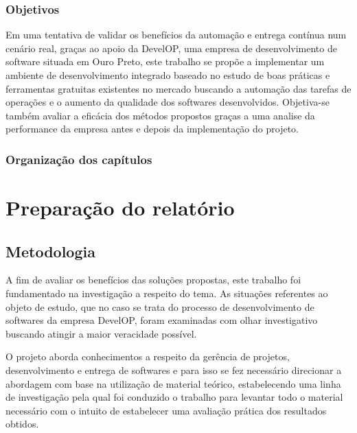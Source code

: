 \documentclass[
	12pt,				%
	openright,			%
	twoside,			%
	a4paper,			%
	english,			%
	french,				%
	spanish,			%
	brazil,				%
	]{abntex2}
\begin{document}
\section{Objetivos}

Em uma tentativa de validar os benefícios da automação e entrega contínua num cenário real, graças ao apoio da DevelOP, uma empresa de desenvolvimento de software situada em Ouro Preto, este trabalho se propõe a implementar um ambiente de desenvolvimento integrado baseado no estudo de boas práticas e ferramentas gratuitas existentes no mercado buscando a automação das tarefas de operações e o aumento da qualidade dos softwares desenvolvidos. Objetiva-se também avaliar a eficácia dos métodos propostos graças a uma analise da performance da empresa antes e depois da implementação do projeto.

\section{Organização dos capítulos}

\part{Preparação do relatório}

\chapter{Metodologia}

A fim de avaliar os benefícios das soluções propostas, este trabalho foi fundamentado na investigação a respeito do tema. As situações referentes ao objeto de estudo, que no caso se trata do processo de desenvolvimento de softwares da empresa DevelOP, foram examinadas com olhar investigativo buscando atingir a maior veracidade possível.

O projeto aborda conhecimentos a respeito da gerência de projetos, desenvolvimento e entrega de softwares e para isso se fez necessário direcionar a abordagem com base na utilização de material teórico, estabelecendo uma linha de investigação pela qual foi conduzido o trabalho para levantar todo o material necessário com o intuito de estabelecer uma avaliação prática dos resultados obtidos.
\end{document}
